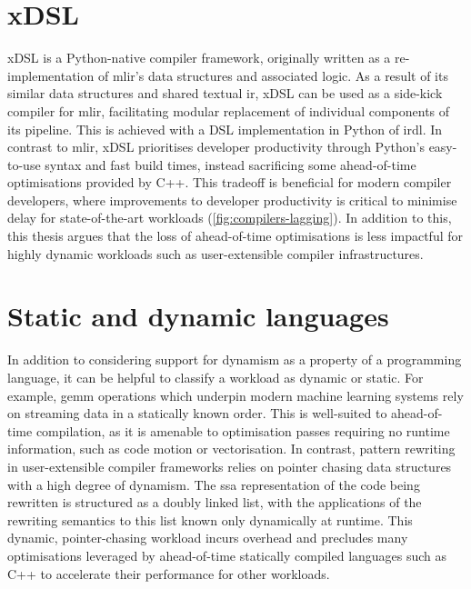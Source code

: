 
\section{xDSL}
\label{sec:xdsl}

xDSL is a Python-native compiler framework, originally written as a re-implementation of \ac{mlir}'s data structures and associated logic.
As a result of its similar data structures and shared textual \ac{ir}, xDSL can be used as a side-kick compiler for \ac{mlir}, facilitating modular replacement of individual components of its pipeline. This is achieved with a DSL implementation in Python of \ac{irdl}.
In contrast to \ac{mlir}, xDSL prioritises developer productivity through Python's easy-to-use syntax and fast build times, instead sacrificing some ahead-of-time optimisations provided by C++.
This tradeoff is beneficial for modern compiler developers, where improvements to developer productivity is critical to minimise delay for state-of-the-art workloads (\autoref{fig:compilers-lagging}). In addition to this, this thesis argues that the loss of ahead-of-time optimisations is less impactful for highly dynamic workloads such as user-extensible compiler infrastructures.



\section{Static and dynamic languages}
\label{sec:static-dynamic-languages}


In addition to considering support for dynamism as a property of a programming language, it can be helpful to classify a workload as dynamic or static.
For example, \ac{gemm} operations which underpin modern machine learning systems rely on streaming data in a statically known order. This is well-suited to ahead-of-time compilation, as it is amenable to optimisation passes requiring no runtime information, such as code motion or vectorisation. %
In contrast, pattern rewriting in user-extensible compiler frameworks relies on pointer chasing data structures with a high degree of dynamism. The \ac{ssa} representation of the code being rewritten is structured as a doubly linked list, with the applications of the rewriting semantics to this list known only dynamically at runtime.
This dynamic, pointer-chasing workload incurs overhead and precludes many optimisations leveraged by ahead-of-time statically compiled languages such as C++ to accelerate their performance for other workloads.



